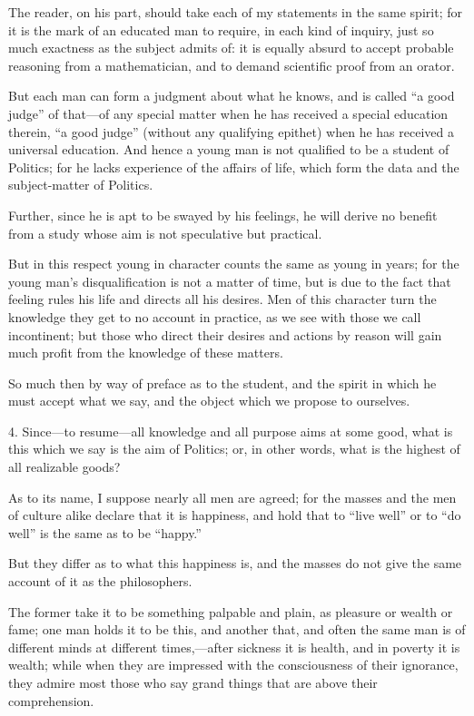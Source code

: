 The reader, on his part, should take each of my statements in the same
spirit; for it is the mark of an educated man to require, in each kind
of inquiry, just so much exactness as the subject admits of: it is
equally absurd to accept probable reasoning from a mathematician, and
to demand scientific proof from an orator.

But each man can form a judgment about what he knows, and is called
``a good judge'' of that---of any special matter when he has received
a special education therein, ``a good judge'' (without any qualifying
epithet) when he has received a universal education. And hence a young
man is not qualified to be a student of Politics; for he lacks
experience of the affairs of life, which form the data and the
subject-matter of Politics.

Further, since he is apt to be swayed by his feelings, he will derive
no benefit from a study whose aim is not speculative but practical.

But in this respect young in character counts the same as young in
years; for the young man's disqualification is not a matter of time,
but is due to the fact that feeling rules his life and directs all his
desires. Men of this character turn the knowledge  they get to
no account in practice, as we see with those we call incontinent; but
those who direct their desires and actions by reason will gain much
profit from the knowledge of these matters.

So much then by way of preface as to the student, and the spirit in
which he must accept what we say, and the object which we propose to
ourselves.

4. Since---to resume---all knowledge and all purpose aims at some
good, what is this which we say is the aim of Politics; or, in other
words, what is the highest of all realizable goods?

As to its name, I suppose nearly all men are agreed; for the masses
and the men of culture alike declare that it is happiness, and hold
that to ``live well'' or to ``do well'' is the same as to be
``happy.''

But they differ as to what this happiness is, and the masses do not
give the same account of it as the philosophers.

The former take it to be something palpable and plain, as pleasure or
wealth or fame; one man holds it to be this, and another that, and
often the same man is of different minds at different times,---after
sickness it is health, and in poverty it is wealth; while when they
are impressed with the consciousness of their ignorance, they admire
most those who say grand things that are above their comprehension.

